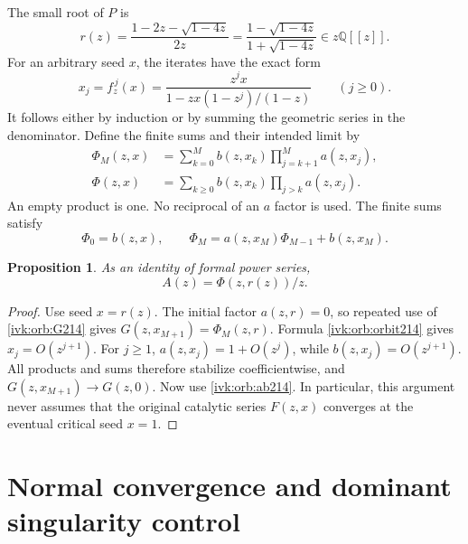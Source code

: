\documentclass[11pt,letterpaper]{article}
\newtheorem{proposition}[theorem]{Proposition}
\theoremstyle{remark}\newtheorem{remark}[theorem]{Remark}
\newcommand{\Q}{\mathbb Q}
\begin{document}
The small root of $P$ is
\begin{equation}\label{ivk:orb:r214}
r(z)=\frac{1-2z-\sqrt{1-4z}}{2z}
=\frac{1-\sqrt{1-4z}}{1+\sqrt{1-4z}}\in z\Q[[z]].
\end{equation}
For an arbitrary seed $x$, the iterates have the exact form
\begin{equation}\label{ivk:orb:orbit214}
x_j=f_z^{\,j}(x)=
\frac{z^jx}{1-zx(1-z^j)/(1-z)}\qquad(j\ge0).
\end{equation}
It follows either by induction or by summing the geometric series
in the denominator. Define the finite sums and their intended limit by
\begin{align}
\Phi_M(z,x)&=\sum_{k=0}^{M}b(z,x_k)\prod_{j=k+1}^{M}a(z,x_j),\label{ivk:orb:partial214}\\
\Phi(z,x)&=\sum_{k\ge0}b(z,x_k)\prod_{j>k}a(z,x_j).\label{ivk:orb:phi214}
\end{align}
An empty product is one. No reciprocal of an $a$ factor is used.
The finite sums satisfy
\begin{equation}\label{ivk:orb:partialrec214}
\Phi_0=b(z,x),\qquad
\Phi_M=a(z,x_M)\Phi_{M-1}+b(z,x_M).
\end{equation}

\begin{proposition}\label{ivk:orb:formal214}
As an identity of formal power series,
\begin{equation}\label{ivk:orb:representation214}
A(z)=\Phi(z,r(z))/z.
\end{equation}
\end{proposition}
\begin{proof}
Use seed $x=r(z)$. The initial factor $a(z,r)=0$, so repeated use of
\eqref{ivk:orb:G214} gives $G(z,x_{M+1})=\Phi_M(z,r)$. Formula
\eqref{ivk:orb:orbit214} gives $x_j=O(z^{j+1})$. For $j\ge1$,
$a(z,x_j)=1+O(z^j)$, while $b(z,x_j)=O(z^{j+1})$.
All products and sums therefore stabilize coefficientwise, and
$G(z,x_{M+1})\to G(z,0)$. Now use \eqref{ivk:orb:ab214}.
In particular, this argument never assumes that the original catalytic
series $F(z,x)$ converges at the eventual critical seed $x=1$.
\end{proof}

\section{Normal convergence and dominant singularity control}
\end{document}
